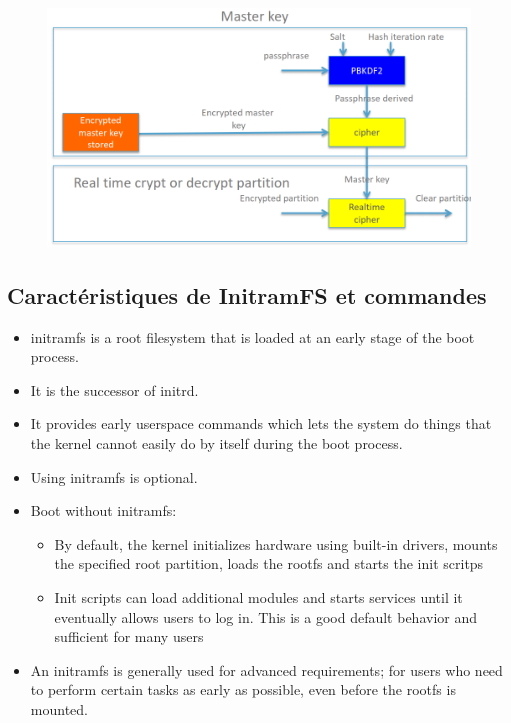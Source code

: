 \documentclass[resume]{subfiles}
\begin{document}
\begin{figure}[H]
    \centering
    \includegraphics[width=1\columnwidth]{Figures/fileSystem/luksMastKey.png}
    \label{fig:luksMastKey}
\end{figure}

\subsection{Caractéristiques de InitramFS et commandes}

\begin{itemize}
\item initramfs is a root filesystem that is loaded at an early stage of the boot
process.
\item It is the successor of initrd.
\item It provides early userspace commands which lets the system do things that
the kernel cannot easily do by itself during the boot process.
\item Using initramfs is optional.
\item Boot without initramfs:
\begin{itemize}
\item By default, the kernel initializes hardware using built-in drivers, mounts the specified root partition, loads the rootfs and starts the init scritps
\item Init scripts can load additional modules and starts services until it eventually allows users to log in. This is a good default behavior and sufficient for many users
\end{itemize}
\item An initramfs is generally used for advanced requirements; for users who need to perform certain tasks as early as possible, even before the rootfs is mounted.
\end{itemize}
\end{document}
